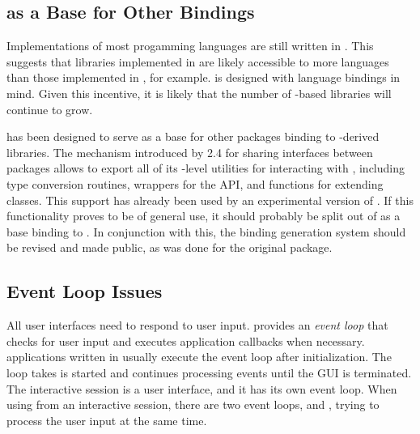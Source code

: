 \documentclass[article]{jss}
\begin{document}
\subsection[RGtk2 as a Base for Other GObject Bindings]{ as
a Base for Other  Bindings}


Implementations of most progamming languages are still written in
. This suggests that libraries implemented in 
are likely accessible to more languages than those implemented in
, for example.  is designed with language
bindings in mind.
Given this incentive, it is likely that the number of -based libraries will continue to grow.

 has been designed to serve as a base for other
packages binding to -derived libraries. The mechanism
introduced
by  2.4 for sharing  interfaces between
packages allows
 to export all of its -level utilities for 
interacting with , including type conversion routines,
wrappers
for the  API, and functions for extending 
classes.
This support has already been used by an experimental version of
\citep{ggobi-beta}. If this functionality proves to be of general use, 
it should probably be split out of  as a base binding to
.
In conjunction with this, the binding generation system should be
revised
and made public, as was done for the original  package.

\subsection{Event Loop Issues}

All user interfaces need to respond to user input.  provides
an \emph{event loop} that checks for user input and executes
application callbacks when necessary.  applications written
in  usually execute the  event loop after
initialization. The loop takes is started and continues processing
events until the GUI is terminated. The interactive 
session is a user interface, and it has its own event loop. When using
 from an interactive session, there are two event loops,
 and , trying to process the user input at the
same
time.
\end{document}
